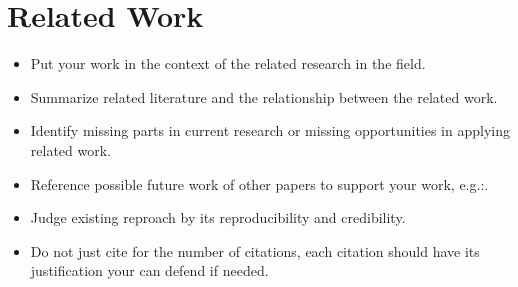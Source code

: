 \section{Related Work}

\begin{itemize}
	\item Put your work in the context of the related research in the field.
	\item Summarize related literature and the relationship between the related work.
	\item Identify missing parts in current research or missing opportunities in applying related work.
	\item Reference possible future work of other papers to support your work, e.g.:.
	\item Judge existing reproach by its reproducibility and credibility.
	\item Do not just cite for the number of citations, each citation should have its justification your can defend if needed.
\end{itemize}
